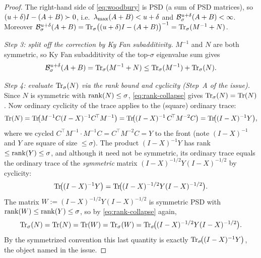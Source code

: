 \begin{proof}
The right-hand side of \eqref{eq:woodbury} is PSD (a sum of PSD matrices),
so $(u+\delta)I-(A+B)\succ0$, i.e.\ $\lambda_{\max}(A+B)<u+\delta$ and
$\mathcal{B}^{u+\delta}_{\sigma}(A+B)<\infty$. Moreover
$\mathcal{B}^{u+\delta}_{\sigma}(A+B)=\operatorname{Tr}_{\sigma}\bigl((u+\delta)I-(A+B)\bigr)^{-1}
=\operatorname{Tr}_{\sigma}(M^{-1}+N)$.

\medskip\noindent\emph{Step 3: split off the correction by Ky Fan
subadditivity.}\quad
$M^{-1}$ and $N$ are both symmetric, so Ky Fan subadditivity of the top-$\sigma$
eigenvalue sum \cite[Thm.~4.3.47a]{HJ12} gives
\begin{equation}\label{eq:kyfan-split}
  \mathcal{B}^{u+\delta}_{\sigma}(A+B)
   =\operatorname{Tr}_{\sigma}(M^{-1}+N)
   \le \operatorname{Tr}_{\sigma}(M^{-1})+\operatorname{Tr}_{\sigma}(N).
\end{equation}

\medskip\noindent\emph{Step 4: evaluate $\operatorname{Tr}_{\sigma}(N)$ via the rank bound and
cyclicity (Step~A of the issue).}\quad
Since $N$ is symmetric with $\operatorname{rank}(N)\le\sigma$, \eqref{eq:rank-collapse}
gives $\operatorname{Tr}_{\sigma}(N)=\operatorname{Tr}(N)$. Now ordinary cyclicity of the trace applies to
the (square) ordinary trace:
\[
  \operatorname{Tr}(N)=\operatorname{Tr}\!\bigl(M^{-1}C(I-X)^{-1}C^{\!\top}M^{-1}\bigr)
   =\operatorname{Tr}\!\bigl((I-X)^{-1}\,C^{\!\top}M^{-2}C\bigr)
   =\operatorname{Tr}\!\bigl((I-X)^{-1}Y\bigr),
\]
where we cycled $C^{\!\top}M^{-1}\cdot M^{-1}C=C^{\!\top}M^{-2}C=Y$ to the front
(note $(I-X)^{-1}$ and $Y$ are square of size $\le\sigma$). The product
$(I-X)^{-1}Y$ has rank $\le\operatorname{rank}(Y)\le\sigma$, and although it need not be
symmetric, its ordinary trace equals the ordinary trace of the \emph{symmetric}
matrix $(I-X)^{-1/2}Y(I-X)^{-1/2}$ by cyclicity:
\[
  \operatorname{Tr}\!\bigl((I-X)^{-1}Y\bigr)
  =\operatorname{Tr}\!\bigl((I-X)^{-1/2}Y(I-X)^{-1/2}\bigr).
\]
The matrix $W:=(I-X)^{-1/2}Y(I-X)^{-1/2}$ is symmetric PSD with
$\operatorname{rank}(W)\le\operatorname{rank}(Y)\le\sigma$, so by \eqref{eq:rank-collapse} again,
\begin{equation}\label{eq:N-as-W}
  \operatorname{Tr}_{\sigma}(N)=\operatorname{Tr}(N)=\operatorname{Tr}(W)=\operatorname{Tr}_{\sigma}(W)
   =\operatorname{Tr}_{\sigma}\!\bigl((I-X)^{-1/2}Y(I-X)^{-1/2}\bigr).
\end{equation}
By the symmetrized convention this last quantity is exactly
$\operatorname{Tr}_{\sigma}\!\bigl((I-X)^{-1}Y\bigr)$, the object named in the issue.


\end{proof}
